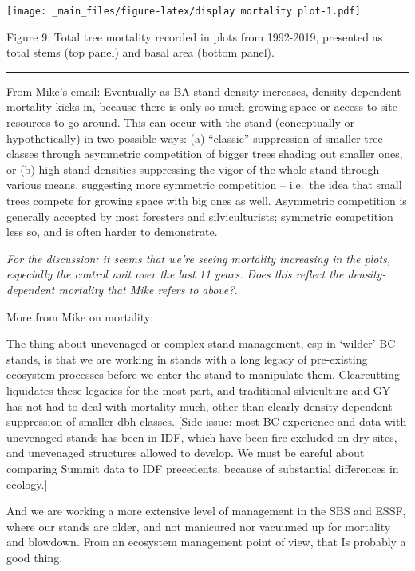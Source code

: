\documentclass[
]{article}
\begin{document}
\texttt{[image: \_main\_files/figure-latex/display mortality plot-1.pdf]}

Figure 9: Total tree mortality recorded in plots from 1992-2019, presented as total stems (top panel) and basal area (bottom panel).

\begin{center}\rule{0.5\linewidth}{0.5pt}\end{center}

From Mike's email:
Eventually as BA stand density increases, density dependent mortality kicks in, because there is only so much growing space or access to site resources to go around. This can occur with the stand (conceptually or hypothetically) in two possible ways: (a) ``classic'' suppression of smaller tree classes through asymmetric competition of bigger trees shading out smaller ones, or (b) high stand densities suppressing the vigor of the whole stand through various means, suggesting more symmetric competition -- i.e.~the idea that small trees compete for growing space with big ones as well. Asymmetric competition is generally accepted by most foresters and silviculturists; symmetric competition less so, and is often harder to demonstrate.

\emph{For the discussion: it seems that we're seeing mortality increasing in the plots, especially the control unit over the last 11 years. Does this reflect the density-dependent mortality that Mike refers to above?.}

More from Mike on mortality:

The thing about unevenaged or complex stand management, esp in `wilder' BC stands, is that we are working in stands with a long legacy of pre-existing ecosystem processes before we enter the stand to manipulate them. Clearcutting liquidates these legacies for the most part, and traditional silviculture and GY has not had to deal with mortality much, other than clearly density dependent suppression of smaller dbh classes. {[}Side issue: most BC experience and data with unevenaged stands has been in IDF, which have been fire excluded on dry sites, and unevenaged structures allowed to develop. We must be careful about comparing Summit data to IDF precedents, because of substantial differences in ecology.{]}

And we are working a more extensive level of management in the SBS and ESSF, where our stands are older, and not manicured nor vacuumed up for mortality and blowdown. From an ecosystem management point of view, that Is probably a good thing.
\end{document}
